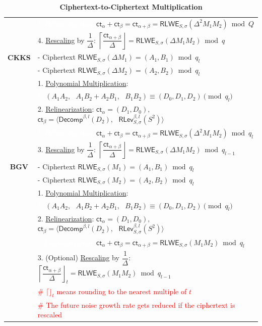 \begin{table}[h]
\begin{tabular}{|c||l|}
&\textcolor{white}{3. Relinearization: } $\textsf{ct}_\alpha + \textsf{ct}_\beta = \textsf{ct}_{\alpha + \beta} = \textsf{RLWE}_{S, \sigma}(\Delta^2 M_1 M_2) \bmod Q$\\
&4. \underline{Rescaling} by $\dfrac{1}{\Delta}$: $\left\lceil\dfrac{\textsf{ct}_{\alpha+\beta}}{\Delta}\right\rfloor = \textsf{RLWE}_{S, \sigma}(\Delta M_1 M_2) \bmod q$\\\hline
\textbf{CKKS}&- Ciphertext $\textsf{RLWE}_{S, \sigma}(\Delta M_1) = (A_1, B_1)  \bmod q_l$\\
&- Ciphertext $\textsf{RLWE}_{S, \sigma}(\Delta M_2) = (A_2, B_2)  \bmod q_l$\\
&1. \underline{Polynomial Multiplication}: \\
& \textcolor{white}{1. } $(A_1A_2, \text{ } A_1B_2 + A_2B_1, \text{ } B_1B_2) \equiv (D_0, D_1, D_2) \pmod{q_l}$\\
&2. \underline{Relinearization}: $\textsf{ct}_\alpha = (D
_1, D_0),$\text{ } $\textsf{ct}_\beta = \bm{\langle} \textsf{Decomp}^{\beta, l}(D_2), \text{ } \textsf{RLev}_{S, \sigma}^{\beta, l}( S^2) \bm{\rangle}$\\
&\textcolor{white}{3. Relinearization: } $\textsf{ct}_\alpha + \textsf{ct}_\beta = \textsf{ct}_{\alpha + \beta} = \textsf{RLWE}_{S, \sigma}(\Delta^2 M_1 M_2) \bmod q_l$\\
&3. \underline{Rescaling} by $\dfrac{1}{\Delta}$: $\left\lceil\dfrac{\textsf{ct}_{\alpha+\beta}}{\Delta}\right\rfloor = \textsf{RLWE}_{S, \sigma}(\Delta M_1 M_2) \bmod q_{l-1}$\\\hline
\textbf{BGV}&- Ciphertext $\textsf{RLWE}_{S, \sigma}(M_1) = (A_1, B_1)  \bmod q_l$\\
&- Ciphertext $\textsf{RLWE}_{S, \sigma}( M_2) = (A_2, B_2)  \bmod q_l$\\
&1. \underline{Polynomial Multiplication}: \\
& \textcolor{white}{1. } $(A_1A_2, \text{ } A_1B_2 + A_2B_1, \text{ } B_1B_2) \equiv (D_0, D_1, D_2) \pmod{q_l}$\\
&2. \underline{Relinearization}: $\textsf{ct}_\alpha = (D
_1, D_0),$\text{ } $\textsf{ct}_\beta = \bm{\langle} \textsf{Decomp}^{\beta, l}(D_2), \text{ } \textsf{RLev}_{S, \sigma}^{\beta, l}( S^2) \bm{\rangle}$\\
&\textcolor{white}{3. Relinearization: } $\textsf{ct}_\alpha + \textsf{ct}_\beta = \textsf{ct}_{\alpha + \beta} = \textsf{RLWE}_{S, \sigma}( M_1 M_2) \bmod q_l$\\
&3. (Optional) \underline{Rescaling} by $\dfrac{1}{\Delta}$: $\left\lceil\dfrac{\textsf{ct}_{\alpha+\beta}}{\Delta}\right\rfloor_t = \textsf{RLWE}_{S, \sigma}(M_1 M_2) \bmod q_{l-1}$\\
&\textcolor{red}{\# $\lceil\rfloor_t$ means rounding to the nearest multiple of $t$}\\
&\textcolor{red}{\# The future noise growth rate gets reduced if the ciphertext is rescaled}\\\hline
\end{tabular}
\caption{\textbf{Ciphertext-to-Ciphertext Multiplication}}
\end{table}


